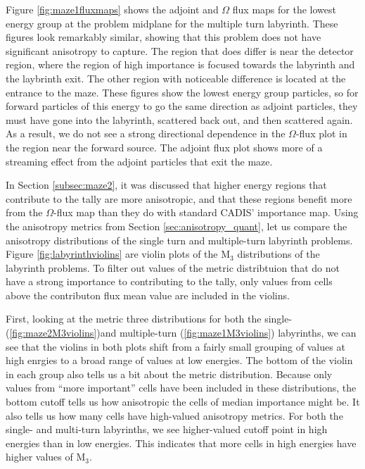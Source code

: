 Figure \ref{fig:maze1fluxmaps} shows the adjoint and $\Omega$ flux maps for the
lowest energy group at the problem midplane for the multiple turn labyrinth.
These figures look remarkably similar, showing that this problem does not have
significant anisotropy to capture. The region that does differ is near the
detector region, where the region of high importance is focused towards the
labyrinth and the laybrinth exit. The other region with noticeable difference is
located at the entrance to the maze. These figures show the lowest energy group
particles, so for forward particles of this energy to go the same direction as
adjoint particles, they must have gone into the labyrinth, scattered back out,
and then scattered again. As a result, we do not see a strong directional
dependence in the $\Omega$-flux plot in the region near the forward source. The
adjoint flux plot shows more of a streaming effect from the adjoint particles
that exit the maze.

In Section \ref{subsec:maze2}, it was discussed that higher energy regions that
contribute to the tally are more anisotropic, and that these regions benefit
more from the $\Omega$-flux map than they do with standard CADIS' importance
map. Using the anisotropy metrics from Section \ref{sec:anisotropy_quant}, let
us compare the anisotropy distributions of the single turn and multiple-turn
labyrinth problems. Figure \ref{fig:labyrinthviolins} are violin plots of the
M$_{3}$ distributions of the labyrinth problems. To filter out values of the
metric distribtuion that do not have a strong importance to contributing to the
tally, only values from cells above the contributon flux mean value are included
in the violins.

First, looking at the metric three distributions for both the single-
(\ref{fig:maze2M3violins})and
multiple-turn (\ref{fig:maze1M3violins}) labyrinths, we can see that the violins
in both plots shift from a fairly small grouping of values at high enrgies to a
broad range of values at low energies. The bottom of the violin in each
group also tells us a
bit about the metric distribution. Because only values from ``more important''
cells have been included in these distributions, the bottom cutoff tells us how
anisotropic the cells of median importance might be. It also tells us how many
cells have high-valued anisotropy metrics. For both the single- and
multi-turn labyrinths, we see higher-valued cutoff point in high energies than
in low energies. This indicates that more cells in high energies have higher
values of M$_3$.

